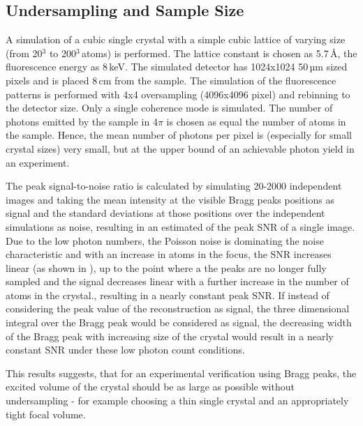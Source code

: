 
\subsection{Undersampling and  Sample Size}


A simulation of a cubic single crystal with a simple cubic lattice of varying size (from 20$^3$ to 200$^3$\,atoms) is performed. The lattice constant is chosen as 5.7\,\AA, the fluorescence energy as 8\,keV. The simulated detector has 1024x1024 50\,µm sized pixels and is placed 8\,cm from the  sample. 
The simulation of the fluorescence patterns is performed with 4x4 oversampling (4096x4096 pixel) and rebinning to the detector size. Only a single coherence mode is simulated. The number of photons emitted by the sample in 4$\pi$ is chosen as equal the number of atoms in the sample. Hence, the mean number of photons per pixel is (especially for small crystal sizes) very small, but at the upper bound of an achievable photon yield in an experiment.

The peak signal-to-noise ratio is calculated by simulating 20-2000 independent images  and taking the mean intensity at the visible Bragg peaks positions as signal and the standard deviations at those positions over the independent simulations as noise, resulting in an estimated of the peak SNR of a single image.
Due to the low photon numbers, the Poisson noise is dominating the noise characteristic and with an increase in atoms in the focus, the SNR increases linear (as shown in ), up to the point where a the peaks are no longer fully sampled and the signal decreases linear with a further increase in the number of atoms in the crystal., resulting in a nearly constant peak SNR.
If instead of considering the peak value of the reconstruction as signal, the three dimensional integral over the Bragg peak would be considered as signal, the decreasing width of the Bragg peak with increasing size of the crystal would result in a nearly constant SNR under these low photon count conditions. 

This results suggests, that for an experimental verification using Bragg peaks, the excited volume of the crystal should be as large as possible without undersampling - for example choosing a thin single crystal and an appropriately tight focal volume.

